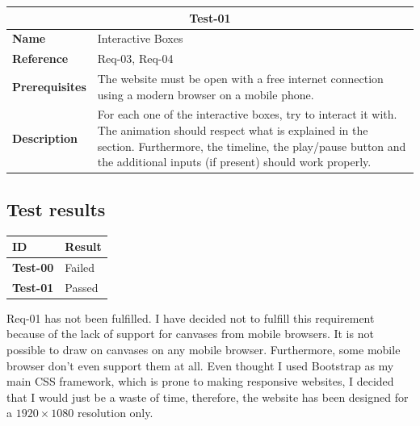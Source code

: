 \documentclass{article}
\begin{document}
\bgroup{}
\def\arraystretch{1.25}
\begin{center}
    \begin{tabular}{ |l|p{9cm}| }
        \hline
        \multicolumn{2}{|c|}{\textbf{Test-01}} \\
        \hline
        \textbf{Name} & Interactive Boxes \\
        \hline
        \textbf{Reference} & Req-03, Req-04 \\
        \hline
        \textbf{Prerequisites}
        & The website must be open with a free internet connection
        using a modern browser on a mobile phone. \\
        \hline
        \textbf{Description}
        & For each one of the interactive boxes,
        try to interact it with.
        The animation should respect what is explained in the section.
        Furthermore, the timeline, the play/pause button and the
        additional inputs (if present) should work properly. \\
        \hline
    \end{tabular}
\end{center}
\egroup{}

\subsection{Test results}

\bgroup{}
\def\arraystretch{1.25}
\begin{center}
    \begin{tabular}{ |l|l| }
        \hline
        \textbf{ID} & Result \\
        \hline
        \textbf{Test-00} & \color{red} Failed \\
        \hline
        \textbf{Test-01} & \color{darkgreen} Passed \\
        \hline
    \end{tabular}
\end{center}
\egroup{}

Req-01 has not been fulfilled. I have decided not to fulfill this requirement because of the lack
of support for canvases from mobile browsers. It is not possible to draw on canvases on any mobile
browser. Furthermore, some mobile browser don't even support them at all.
Even thought I used Bootstrap as my main CSS framework, which is prone to making responsive websites,
I decided that I would just be a waste of time, therefore, the website has been designed for a \(1920\times1080\) resolution only.
\end{document}
